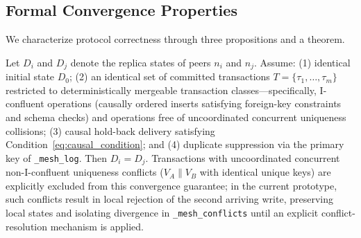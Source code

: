 \begin{table}[!t]
\caption{Conflict Class Resolution Summary}
\label{tab:conflict-classes}
\centering
{}
\end{table}

\subsection{Formal Convergence Properties}
We characterize protocol correctness through three propositions and a theorem.

\begin{proposition}
\label{prop:validated-convergence}
Let $D_i$ and $D_j$ denote the replica states of peers $n_i$ and $n_j$. Assume: (1) identical initial state $D_0$; (2) an identical set of committed transactions $T = \{\tau_1,\dots,\tau_m\}$ restricted to deterministically mergeable transaction classes---specifically, I-confluent operations (causally ordered inserts satisfying foreign-key constraints and schema checks) and operations free of uncoordinated concurrent uniqueness collisions; (3) causal hold-back delivery satisfying Condition~\eqref{eq:causal_condition}; and (4) duplicate suppression via the primary key of \texttt{\_mesh\_log}. Then $D_i = D_j$.
Transactions with uncoordinated concurrent non-I-confluent uniqueness conflicts ($V_A \parallel V_B$ with identical unique keys) are explicitly excluded from this convergence guarantee; in the current prototype, such conflicts result in local rejection of the second arriving write, preserving local states and isolating divergence in \texttt{\_mesh\_conflicts} until an explicit conflict-resolution mechanism is applied.
\end{proposition}

